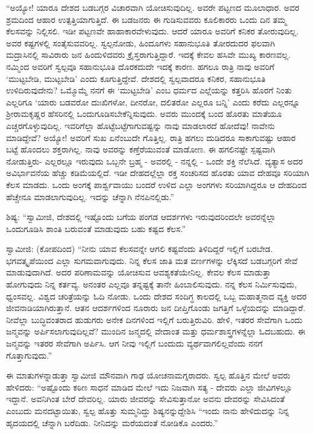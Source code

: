  “ಅಯ್ಯೋ! ಯಾರೂ ದೇಶದ ಬಡಬಗ್ಗರ ವಿಚಾರವಾಗಿ ಯೋಚಿಸುವುದಿಲ್ಲ. ಅವರೇ ಪಟ್ಟಣದ ಮೂಲಾಧಾರ. ಅವರ ಶ್ರಮದಿಂದ ಆಹಾರ ಉತ್ಪತ್ತಿಯಾಗುತ್ತಿದೆ. ಈ ಬಡಜನರು ಈ ಗುಡಿಸುವವರು ಕೂಲಿಕಾರರು ಒಂದು ದಿನ ತಮ್ಮ ಕೆಲಸವನ್ನು ನಿಲ್ಲಿಸಲಿ. ಇಡೀ ಪಟ್ಟಣವೇ ಹಾಹಾಕಾರವೇಳುವುದು. ಆದರೆ ಯಾರೂ ಅವರಿಗೆ ಕನಿಕರ ತೋರುವುದಿಲ್ಲ. ಅವರ ಕಷ್ಟಗಳಲ್ಲಿ ಸಂತೈಸುವವರಿಲ್ಲ. ಸ್ವಲ್ಪನೋಡು, ಹಿಂದೂಗಳು ಸಹಾನುಭೂತಿ ತೋರದುದರ ಫಲವಾಗಿ ಮದ್ರಾಸಿನಲ್ಲಿ ಸಾವಿರಾರು ಜನ ಹಿಂದುಳಿದವರು ಕ್ರೈಸ್ತರಾಗುತ್ತಿದ್ದಾರೆ. ಇದಕ್ಕೆ ಕೇವಲ ಹಸಿವೇ ಮುಖ್ಯ ಕಾರಣವಲ್ಲ. ನಮ್ಮಿಂದ ಅವರಿಗೆ ಸ್ವಲ್ಪವೂ ಸಹಾನುಭೂತಿ ದೊರಕದುದೇ ಇದಕ್ಕೆ ಕಾರಣ. ಹಗಲೂ ರಾತ್ರಿ ನಾವು ಅವರಿಗೆ ‘ಮುಟ್ಟಬೇಡಿ, ಮುಟ್ಟಬೇಡಿ’ ಎಂದು ಕೂಗುತ್ತಿದ್ದೇವೆ. ದೇಶದಲ್ಲಿ ಸ್ವಲ್ಪವಾದರೂ ಕನಿಕರ, ಸಹಾನುಭೂತಿ ಉಳಿದಿರುವುದೇನು? ಒಮ್ಮೊಮ್ಮೆ ನನಗೆ ಈ ‘ಮುಟ್ಟಬೇಡಿ’ ಎಂಬ ಧರ್ಮದ ಎಲ್ಲೆಯನ್ನು ಕತ್ತರಿಸಿ ಹೊರಗೆ ನಿಂತು ಎಲ್ಲರಿಗೂ ‘ಯಾರು ಬಡವರೋ ದುಃಖಿಗಳೋ, ದೀನರೋ, ದಲಿತರೋ ಎಲ್ಲರೂ ಬನ್ನಿ’ ಎಂದು ಕರೆದು ಎಲ್ಲರನ್ನೂ ಶ‍್ರೀರಾಮಕೃಷ್ಣರ ಹೆಸರಿನಲ್ಲಿ ಒಂದುಗೂಡಿಸಬೇಕೆನ್ನಿಸುವುದು. ಅವರು ಮುಂದಕ್ಕೆ ಬಂದ ಹೊರತು ಮಾತೆಯೂ ಎಚ್ಚರಗೊಳ್ಳುವುದಿಲ್ಲ. ಇವರಿಗೆಲ್ಲಾ ಹೊಟ್ಟೆಬಟ್ಟೆಗಾಗುವಷ್ಟನ್ನು ನಾವು ಮಾಡಲಾರದೆ ಹೋದೆವು‌! ನಾವೇನು ಮಾಡಿದ್ದೇವೆ? ಅಯ್ಯೋ! ಅವರಿಗೆ ಸುಖ ಏನೆಂಬುದೇ ಗೊತ್ತಿಲ್ಲ. ರಾತ್ರಿ ಹಗಲು ದುಡಿದರೂ ಸಾಕಾಗುವಷ್ಟು ಆಹಾರ ಬಟ್ಟೆ ಹೊಂದಲು ಶಕ್ತರಾಗಿಲ್ಲ. ನಾವು ಅವರನ್ನು ಕಣ್ತೆರೆಯುವಂತೆ ಮಾಡೋಣ. ಈ ಹಗಲಿನಷ್ಟೇ ಸ್ಪಷ್ಟವಾಗಿ ನೋಡುತ್ತಿರು- ಎಲ್ಲರಲ್ಲೂ ಇರುವುದು ಒಬ್ಬನೇ ಬ್ರಹ್ಮ - ಅವರಲ್ಲಿ - ನನ್ನಲ್ಲಿ - ಒಂದೇ ಶಕ್ತಿ ನೆಲೆಸಿದೆ. ವ್ಯತ್ಯಾಸ ಅದರ ಅವಿರ್ಭಾವನೆಯ ಹೆಚ್ಚು ಕಡಿಮೆಯಲ್ಲಿದೆ. ಇಡೀ ದೇಹದಲ್ಲೆಲ್ಲಾ ರಕ್ತ ಸಂಚರಿಸದ ಹೊರತು ಯಾವ ದೇಹವೂ ಸರಿಯಾಗಿ ಕೆಲಸ ಮಾಡದು. ಒಂದು ಅಂಗಕ್ಕೆ ಪಾರ್ಶ್ವವಾಯು ಬಂದರೆ ಉಳಿದ ಎಲ್ಲಾ ಅಂಗಗಳು ಸರಿಯಾಗಿದ್ದರೂ ಆ ದೇಹದಿಂದ ಹೆಚ್ಚೇನೂ ಮಾಡಲಾಗುವುದಿಲ್ಲ. ಇದನ್ನು ಚೆನ್ನಾಗಿ ನೆನಪಿನಲ್ಲಿಡು.” 

 ಶಿಷ್ಯ: “ಸ್ವಾಮೀಜಿ, ದೇಶದಲ್ಲಿ ಇಷ್ಟೊಂದು ಬಗೆಯ ಪಂಗಡ ಆದರ್ಶಗಳು ಇರುವುದರಿಂದಲೇ ಅವರನ್ನೆಲ್ಲಾ ಒಂದುಗೂಡಿಸಿ ಶಾಂತಿ ಬರುವಂತೆ ಮಾಡುವುದು ಬಹು ಕಷ್ಟದ ಕೆಲಸ.” 

 ಸ್ವಾಮೀಜಿ: (ಕೋಪದಿಂದ) “ನೀನು ಯಾವ ಕೆಲಸವನ್ನೇ ಆಗಲಿ ಕಷ್ಟವೆಂದು ತಿಳಿದಿದ್ದರೆ ಇಲ್ಲಿಗೆ ಬರಬೇಡ. ಭಗವತ್ಕೃಪೆಯಿಂದ ಎಲ್ಲಾ ಸುಗಮವಾಗುವುದು. ನಿನ್ನ ಕೆಲಸ ಜಾತಿ ಮತ ವರ್ಣಗಳನ್ನು ಲೆಕ್ಕಿಸದೆ ಬಡಬಗ್ಗರಿಗೆ ಸೇವೆ ಮಾಡುವುದಾಗಿದೆ. ಅದರ ಪರಿಣಾಮವನ್ನು ಯೋಚಿಸುವ ಆವಶ್ಯಕತೆಯೇನಿಲ್ಲ. ಕೇವಲ ಕೆಲಸ ಮಾಡುತ್ತಾ ಹೋಗುವುದು ನಿನ್ನ ಕರ್ತವ್ಯ. ಅನಂತರ ಎಲ್ಲವೂ ತನ್ನಷ್ಟಕ್ಕೆ ತಾನೇ ಹಿಂಬಾಲಿಸುವುದು. ನನ್ನ ಕೆಲಸ ನಿರ್ಮಿಸುವುದು, ಧ್ವಂಸವಲ್ಲ. ವಿಶ್ವದ ಚರಿತ್ರೆಯನ್ನು ಓದಿ ನೋಡು. ಒಂದು ದೇಶದ ಸಂದಿಗ್ಧ ಕಾಲದಲ್ಲಿ ಒಬ್ಬ ಮಹಾತ್ಮನಾದ ವ್ಯಕ್ತಿ ಅದರ ಜೀವನಾಡಿಯಾಗಿರುತ್ತಾನೆ. ಆತನ ಆದರ್ಶಗಳಿಂದ ನೂರಾರು ಜನ ದೀಪ್ತಿಗೊಂಡು ಜಗತ್ತಿಗೆ ಒಳ್ಳೆಯದನ್ನು ಮಾಡಿದ್ದಾರೆ. ನೀವೆಲ್ಲಾ ಬುದ್ಧಿವಂತರಾದ ಹುಡುಗರು ಅನೇಕ ದಿನಗಳಿಂದ ಇಲ್ಲಿಗೆ ಬರುತ್ತಿರುವಿರಿ. ಹೇಳಿ, ಇತರರ ಸೇವೆಗಾಗಿ ಒಂದು ಜನ್ಮವನ್ನು ಅರ್ಪಿಸಲಾಗುವುದಿಲ್ಲವೆ? ಮುಂದಿನ ಜನ್ಮದಲ್ಲಿ ವೇದಾಂತ ಮತ್ತು ಧರ್ಮಶಾಸ್ತ್ರಗಳನ್ನೆಲ್ಲಾ ಓದಬಹುದು. ಈ ಜನ್ಮವನ್ನು ಇತರರ ಸೇವೆಗಾಗಿ ಅರ್ಪಿಸಿ. ಆಗ ನೀವು ಇಲ್ಲಿಗೆ ಬಂದುದು ವ್ಯರ್ಥವಾಗಲಿಲ್ಲವೆಂದು ನನಗೆ ಗೊತ್ತಾಗುವುದು.” 

 ಈ ಮಾತುಗಳನ್ನಾಡುತ್ತಾ ಸ್ವಾಮೀಜಿ ಮೌನವಾಗಿ ಗಾಢ ಯೋಚನಾಮಗ್ನರಾದರು. ಸ್ವಲ್ಪ ಹೊತ್ತಿನ ಮೇಲೆ ಅವರು ಹೇಳಿದರು: “ಅಷ್ಟೊಂದು ಕಠಿಣ ಸಾಧನೆ ಮಾಡಿದ ಮೇಲೆ ಇದು ನಿಜವಾಗಿ ಸತ್ಯ - ದೇವರು ಎಲ್ಲಾ ಜೀವಿಗಳಲ್ಲೂ ಇದ್ದಾನೆ. ಅವನಿಗಿಂತ ಬೇರೆ ದೇವರಿಲ್ಲ. ಯಾರು ಜೀವರನ್ನು ಸೇವಿಸುತ್ತಾನೋ ಅವನು ದೇವರನ್ನು ಸೇವಿಸಿದಂತೆ ಎಂಬುದು ಮನದಟ್ಟಾಯಿತು, ಸ್ವಲ್ಪ ಹೊತ್ತು ಸುಮ್ಮನಿದ್ದು ಶಿಷ್ಯನನ್ನುದ್ದೇಶಿಸಿ “ಇಂದು ನಾನು ಹೇಳಿದುದನ್ನು ನಿನ್ನ ಹೃದಯದಲ್ಲಿ ಚೆನ್ನಾಗಿ ಬರೆದಿಡು. ನೀನಿದನ್ನು ಮರೆಯದಂತೆ ನೋಡಿಕೊ ಎಂದರು.” 

